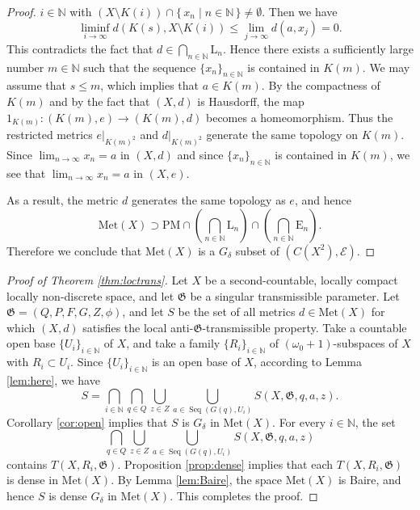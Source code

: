 \documentclass[a4paper, 12pt]{amsart}
\theoremstyle{plain}
\theoremstyle{definition}
\theoremstyle{remark}
\newcommand{\nn}{\mathbb{N}}
\DeclareMathOperator{\seq}{Seq}
\newcommand{\met}[1]{\mathrm{Met}(#1)}
\newcommand{\yopset}{\mathrm{PM}}
\newcommand{\yolset}[1]{\mathrm{L}_{#1}}
\newcommand{\yoeset}[1]{\mathrm{E}_{#1}}
\newcommand{\yokset}[1]{K(#1)}
\begin{document}
\begin{proof}
$i\in \nn$ 
with
 $(X\setminus \yokset{i})\cap \{\, x_{n}\mid {n\in \nn}\, \}\neq \emptyset$. 
Then we have
\[
	\liminf_{i\to \infty}d(\yokset{s}, X\setminus \yokset{i})
	\le 
	\lim_{j\to \infty}d(a, x_{j})
	=
	0.
\] 
This contradicts the fact that 
$d\in \bigcap_{n\in \nn}\yolset{n}$. 
Hence there exists 
a sufficiently large number 
$m\in \nn$ 
such that  
the sequence 
$\{x_{n}\}_{n\in \nn}$ 
is contained in 
$\yokset{m}$. 
 We may assume that 
 $s\le m$, which implies that 
 $a\in \yokset{m}$. 
By the compactness of 
$\yokset{m}$ and by 
the fact that 
$(X, d)$ 
is Hausdorff, 
the map 
$1_{\yokset{m}}\colon (\yokset{m}, e)\to (\yokset{m}, d)$
becomes a homeomorphism. 
Thus 
the restricted metrics 
$e|_{\yokset{m}^{2}}$ and 
$d|_{\yokset{m}^{2}}$ 
generate the same topology on 
$\yokset{m}$. 
Since  
$\lim_{n\to\infty}x_{n}=a$ in $(X, d)$
and since 
$\{x_{n}\}_{n\in \nn}$
 is 
 contained in 
$\yokset{m}$, 
we see that 
$\lim_{n\to\infty}x_{n}=a$
in 
$(X, e)$. 

As a result, 
the metric 
$d$
 generates the same topology as 
 $e$,  
and hence 
\[
	\met{X}
	\supset 
	\yopset
	\cap 
	\left(
	\bigcap_{n\in \nn} \yolset{n}
	\right)
	\cap  
	\left(
	\bigcap_{n\in \nn}\yoeset{n}
	\right). 
\]
Therefore we conclude that 
$\met{X}$ 
is a 
$G_{\delta}$ 
subset of 
$(C(X^{2}), \mathcal{E})$. 
\end{proof}


\begin{proof}[Proof of Theorem \ref{thm:loctrans}]
Let 
$X$ 
be a second-countable,  
locally compact locally non-discrete space, 
and let 
$\mathfrak{G}$ 
be a  singular transmissible parameter. 
Let 
$\mathfrak{G}=(Q, P, F, G, Z, \phi)$, 
and 
let 
$S$ 
be the set of all metrics 
$d\in \met{X}$ 
for which 
$(X, d)$ 
satisfies 
the local 
anti-$\mathfrak{G}$-transmissible property. 
Take
 a countable open base 
 $\{U_{i}\}_{i\in \nn}$ 
 of $X$,  and take 
 a family 
 $\{R_{i}\}_{i\in \nn}$
 of 
$(\omega_0+1)$-subspaces of 
$X$ with 
$R_{i}\subset U_i$. 
Since 
$\{U_{i}\}_{i\in \nn}$ 
is  an open base of 
$X$, 
according to 
 Lemma
 \ref{lem:here}, 
we have
\[
	S
	=
	\bigcap_{i\in \nn}
	\bigcap_{q\in Q}
	\bigcup_{z\in Z}
	\bigcup_{a\in \seq(G(q), U_{i})}
	S(X, \mathfrak{G}, q, a, z). 
\]
Corollary  \ref{cor:open} 
implies that 
$S$ 
is 
$G_{\delta}$ 
in 
$\met{X}$. 
For every 
$i\in \nn$,  
the set 
\[
	\bigcap_{q\in Q}
	\bigcup_{z\in Z}
	\bigcup_{a\in \seq(G(q), U_i)}
	S(X, \mathfrak{G}, q, a, z)
\]
contains 
$T(X, R_i, \mathfrak{G})$.  
Proposition \ref{prop:dense} 
implies that 
each 
$T(X, R_{i}, \mathfrak{G})$ 
is dense in 
$\met{X}$. 
By Lemma \ref{lem:Baire},  
the space 
$\met{X}$ 
is Baire, 
and hence 
$S$ 
is dense 
$G_{\delta}$ 
in 
$\met{X}$. 
This completes the proof.
\end{proof}
\end{document}
